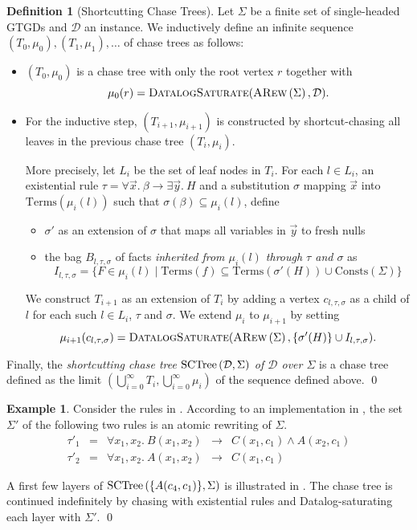 \documentclass[12pt]{report}
\theoremstyle{plain}
\theoremstyle{definition}
\newtheorem{definition}[theorem]{Definition}
\newtheorem{example}[theorem]{Example}
\def\Consts{{\mathrm{Consts}}}
\def\Terms{{\mathrm{Terms}}}
\newcommand{\ARew}[1]{\ensuremath{\normalfont{\textsc{ARew}} \left( #1 \right)}}
\newcommand{\SCTree}[2]{\ensuremath{\normalfont{\textrm{SCTree}} \left( #1, #2 \right)}}
\begin{document}
\begin{definition}[Shortcutting Chase Trees]
  Let $\Sigma$ be a finite set of single-headed GTGDs and $\mathcal{D}$ an instance. We inductively define an infinite sequence $(T_0, \mu_0), (T_1, \mu_1), \ldots$ of chase trees as follows:
  \begin{itemize}
    \item $(T_0, \mu_0)$ is a chase tree with only the root vertex $r$ together with $$\mu_0(r) = \textsc{DatalogSaturate}(\ARew{\Sigma}, \mathcal{D}).$$
    \item For the inductive step, $(T_{i + 1}, \mu_{i + 1})$ is constructed by shortcut-chasing all leaves in the previous chase tree $(T_i, \mu_i)$.
    
    More precisely, let $L_i$ be the set of leaf nodes in $T_i$. For each $l \in L_i$, an existential rule $\tau = \forall \vec{x}.\ \beta \rightarrow \exists \vec{y}.\ H$ and a substitution $\sigma$ mapping $\vec{x}$ into $\Terms(\mu_i(l))$ such that $\sigma(\beta) \subseteq \mu_i(l)$, define
    \begin{itemize}
      \item $\sigma'$ as an extension of $\sigma$ that maps all variables in $\vec{y}$ to fresh nulls
      \item the bag $B_{l, \tau, \sigma}$ of facts \emph{inherited from $\mu_i(l)$ through $\tau$ and $\sigma$} as $$I_{l, \tau, \sigma} = \{ F \in \mu_i(l) \mid \Terms(f) \subseteq \Terms(\sigma'(H)) \cup \Consts(\Sigma) \}$$
    \end{itemize}
    We construct $T_{i+1}$ as an extension of $T_i$ by adding a vertex $c_{l, \tau, \sigma}$ as a child of $l$ for each such $l \in L_i$, $\tau$ and $\sigma$. We extend $\mu_i$ to $\mu_{i+1}$ by setting $$\mu_{i+1}(c_{l, \tau, \sigma}) = \textsc{DatalogSaturate}(\ARew{\Sigma}, \{ \sigma'(H) \} \cup I_{l, \tau, \sigma}).$$
  \end{itemize}
  Finally, the \emph{shortcutting chase tree $\SCTree{\mathcal{D}}{\Sigma}$ of $\mathcal{D}$ over $\Sigma$} is a chase tree defined as the limit $(\bigcup_{i = 0}^\infty T_i, \bigcup_{i = 0}^\infty \mu_i)$ of the sequence defined above.
  \qed
\end{definition}

\begin{example}
  Consider the rules in . According to an implementation in \cite{Benedikt_Rewriting_the_Infinite}, the set $\Sigma'$ of the following two rules is an atomic rewriting of $\Sigma$.
  \[\begin{array}{ccrcl}
    \tau'_1 & = & \forall x_1, x_2.\ B(x_1, x_2) & \rightarrow & C(x_1, c_1) \wedge A(x_2, c_1) \\
    \tau'_2 & = & \forall x_1, x_2.\ A(x_1, x_2) & \rightarrow & C(x_1, c_1)
  \end{array}\]

  A first few layers of $\SCTree{\{ A(c_4, c_1) \}}{\Sigma}$ is illustrated in . The chase tree is continued indefinitely by chasing with existential rules and Datalog-saturating each layer with $\Sigma'$.
  \qed
\end{example}
\end{document}
